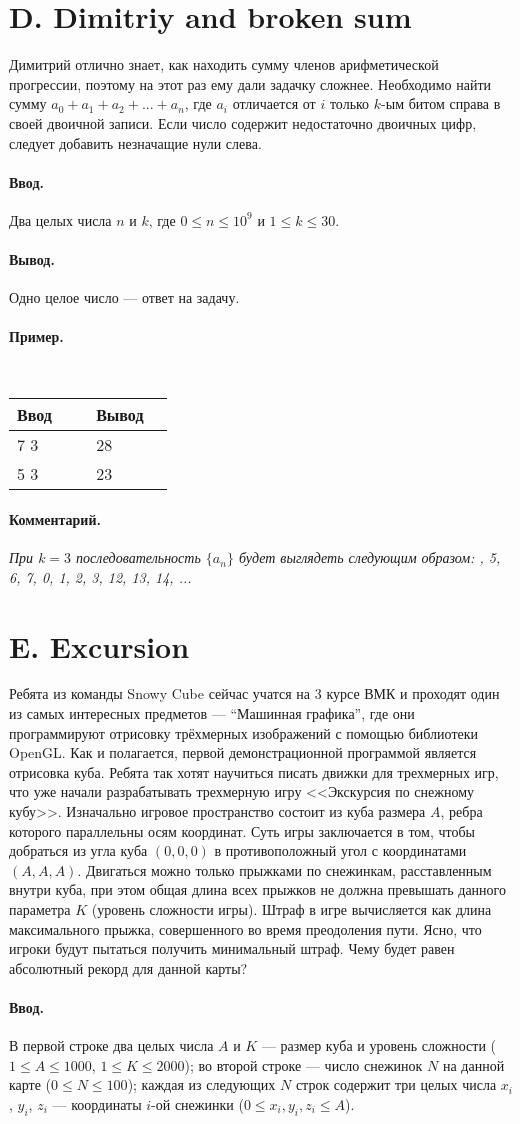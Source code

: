 \documentclass[12pt, a5paper]{article}
\newcommand{\informat}[1]
{
	\paragraph{Ввод.\\} #1
}
\newcommand{\outformat}[1]
{
	\paragraph{Вывод.\\} #1
}
\newcommand{\examplee}[4]
{
	\paragraph{Пример.\\}
	{\tt
	\begin{tabular}{|p{0.4\linewidth}|p{0.4\linewidth}|}
	\hline
	Ввод 	& Вывод  	\\
	\hline
	#1 		& #2 		\\
	\hline
	#3		& #4		\\
	\hline
	\end{tabular}
	}
}
\newcommand{\excomm}[1]
{
	\paragraph{Комментарий. \\}
	\textit{#1}
}
\begin{document}
\section*{D. Dimitriy and broken sum}

Димитрий отлично знает, как находить сумму членов арифметической прогрессии, поэтому на этот раз ему дали задачку сложнее.
Необходимо найти сумму $a_0 + a_1 + a_2 + ... + a_n$, где $a_i$ отличается от $i$ только $k$-ым битом справа в своей двоичной записи. Если число содержит недостаточно двоичных цифр, следует добавить незначащие нули слева.

\informat{Два целых числа $n$ и $k$, где $0 \le n \le 10^9$ и $1 \le k \le 30$.}

\outformat{Одно целое число --- ответ на задачу.}

\examplee{7 3}{28}{5 3}{23}

\excomm{При $k = 3$ последовательность $\{a_n\}$ будет выглядеть следующим образом: \newline
4, 5, 6, 7, 0, 1, 2, 3, 12, 13, 14, ...}



\section*{E. Excursion}

Ребята из команды Snowy Cube сейчас учатся на 3 курсе ВМК и проходят один из самых интересных предметов --- “Машинная графика”, где они программируют отрисовку трёхмерных изображений с помощью библиотеки OpenGL. Как и полагается, первой демонстрационной программой является отрисовка куба. Ребята так хотят научиться писать движки для трехмерных игр, что уже начали разрабатывать трехмерную игру <<Экскурсия по снежному кубу>>. Изначально игровое пространство состоит из куба размера $A$, ребра которого параллельны осям координат. Суть игры заключается в том, чтобы добраться из угла куба $(0, 0, 0)$ в противоположный угол с координатами $(A, A, A)$. Двигаться можно только прыжками по снежинкам, расставленным внутри куба, при этом общая длина всех прыжков не должна превышать данного параметра $K$ (уровень сложности игры). Штраф в игре вычисляется как длина максимального прыжка, совершенного во время преодоления пути. Ясно, что игроки будут пытаться получить минимальный штраф. Чему будет равен абсолютный рекорд для данной карты? 

\informat{В первой строке два целых числа $A$ и $K$ --- размер куба и уровень сложности ($1 \le A \le 1000$, $1 \le K \le 2000$); \newline
во второй строке --- число снежинок $N$ на данной карте ($0 \le N \le 100$); \newline
каждая из следующих $N$ строк содержит три целых числа $x_i$, $y_i$, $z_i$ --- координаты $i$-ой снежинки ($0 \le x_i, y_i, z_i \le A$).}
\end{document}
